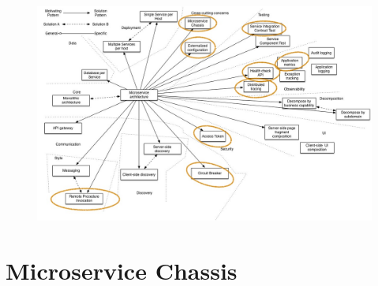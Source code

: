 \documentclass[aspectratio=169]{beamer}
\begin{document}
\begin{frame}{}
\begin{figure}
	\centering
	\includegraphics[width=\linewidth]{Images/PatternsRelatedToMicroservices2}
\end{figure}
\end{frame}



{
    \section{Microservice Chassis}
}
\end{document}
